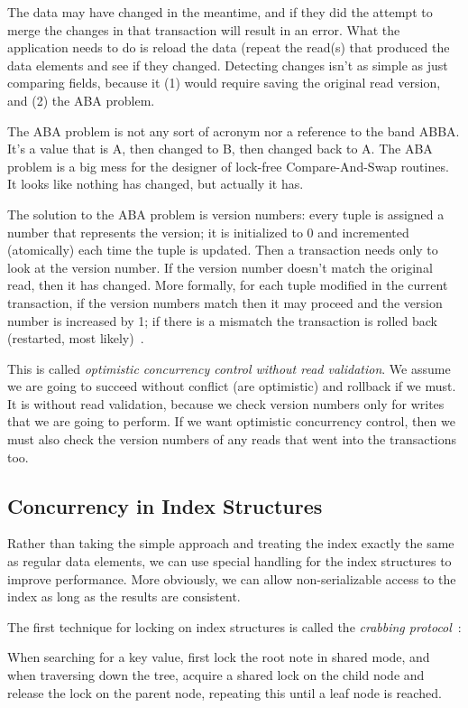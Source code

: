 The data may have changed in the meantime, and if they did the attempt to merge the changes in that transaction will result in an error. What the application needs to do is reload the data (repeat the read(s) that produced the data elements and see if they changed. Detecting changes isn't as simple as just comparing fields, because it (1) would require saving the original read version, and (2) the ABA problem.

The ABA problem is not any sort of acronym nor a reference to the band ABBA. It's a value that is A, then changed to B, then changed back to A. The ABA problem is a big mess for the designer of lock-free Compare-And-Swap routines. It looks like nothing has changed, but actually it has. 

The solution to the ABA problem is version numbers: every tuple is assigned a number that represents the version; it is initialized to 0 and incremented (atomically) each time the tuple is updated. Then a transaction needs only to look at the version number. If the version number doesn't match the original read, then it has changed. More formally, for each tuple modified in the current transaction, if the version numbers match then it may proceed and the version number is increased by 1; if there is a mismatch the transaction is rolled back (restarted, most likely)~\cite{dsc}.

This is called \textit{optimistic concurrency control without read validation}. We assume we are going to succeed without conflict (are optimistic) and rollback if we must. It is without read validation, because we check version numbers only for writes that we are going to perform. If we want optimistic concurrency control, then we must also check the version numbers of any reads that went into the transactions too.


\subsection*{Concurrency in Index Structures}

Rather than taking the simple approach and treating the index exactly the same as regular data elements, we can use special handling for the index structures to improve performance. More obviously, we can allow non-serializable access to the index as long as the results are consistent. 

The first technique for locking on index structures is called the \textit{crabbing protocol}~\cite{dsc}:

When searching for a key value, first lock the root note in shared mode, and when traversing down the tree, acquire a shared lock on the child node and release the lock on the parent node, repeating this until a leaf node is reached.

